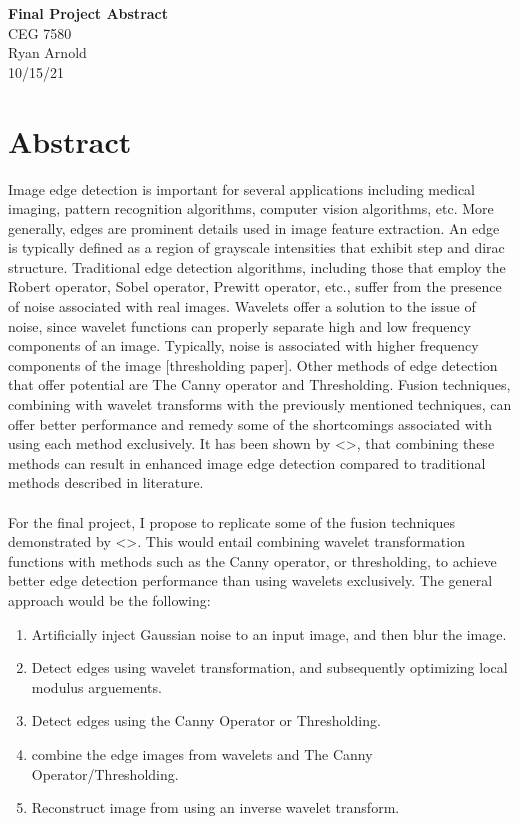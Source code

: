 \documentclass[./abstract_proposal.tex]{subfiles}
\begin{document}


\begin{titlepage}

\noindent
\centering \Huge \textbf{Final Project Abstract} \\
CEG 7580\\
Ryan Arnold \\
10/15/21
\vspace{24pt}

\end{titlepage}

\clearpage
\section*{Abstract}

\noindent Image edge detection is important for several applications including medical imaging, pattern recognition algorithms, computer vision algorithms, etc.  More generally, edges are prominent details used in image feature extraction.  An edge is typically defined as a region of grayscale intensities that exhibit step and dirac structure.  Traditional edge detection algorithms, including those that employ the Robert operator, Sobel operator, Prewitt operator, etc., suffer from the presence of noise associated with real images.  Wavelets offer a solution to the issue of noise, since wavelet functions can properly separate high and low frequency components of an image.  Typically, noise is associated with higher frequency components of the image [thresholding paper].  Other methods of edge detection that offer potential are The Canny operator and Thresholding. Fusion techniques, combining with wavelet transforms with the previously mentioned techniques, can offer better performance and remedy some of the shortcomings associated with using each method exclusively.  It has been shown by <>, that combining these methods can result in enhanced image edge detection compared to traditional methods described in literature.
\\ \\
\noindent For the final project, I propose to replicate some of the fusion techniques demonstrated by <>.  This would entail combining wavelet transformation functions with methods such as the Canny operator, or thresholding, to achieve better edge detection performance than using wavelets exclusively. The general approach would be the following: 

\begin{enumerate}
\item Artificially inject Gaussian noise to an input image, and then blur the image.
\item Detect edges using wavelet transformation, and subsequently optimizing local modulus arguements.
\item Detect edges using the Canny Operator or Thresholding.
\item combine the edge images from wavelets and The Canny Operator/Thresholding.
\item Reconstruct image from using an inverse wavelet transform.
\end{enumerate}
\end{document}
